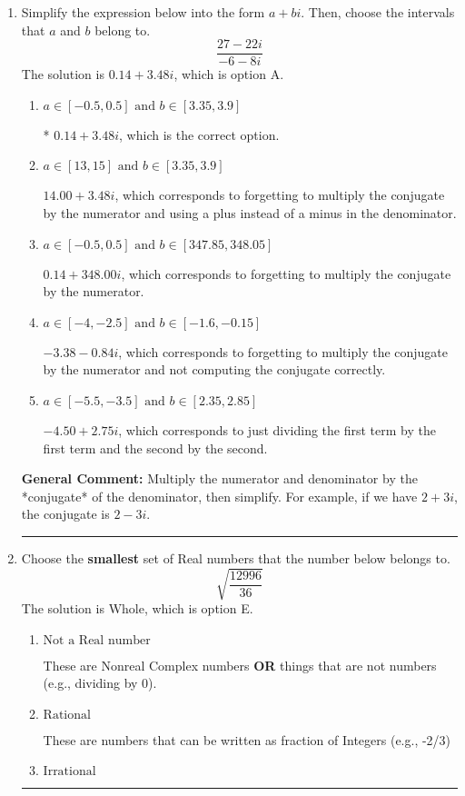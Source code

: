 \documentclass{extbook}[14pt]
\newcommand{\litem}[1]{\item #1

\rule{\textwidth}{0.4pt}}
\begin{document}
\begin{enumerate}\litem{
Simplify the expression below into the form $a+bi$. Then, choose the intervals that $a$ and $b$ belong to.
\[ \frac{27 - 22 i}{-6 - 8 i} \]The solution is \( 0.14  + 3.48 i \), which is option A.\begin{enumerate}[label=\Alph*.]
\item \( a \in [-0.5, 0.5] \text{ and } b \in [3.35, 3.9] \)

* $0.14  + 3.48 i$, which is the correct option.
\item \( a \in [13, 15] \text{ and } b \in [3.35, 3.9] \)

 $14.00  + 3.48 i$, which corresponds to forgetting to multiply the conjugate by the numerator and using a plus instead of a minus in the denominator.
\item \( a \in [-0.5, 0.5] \text{ and } b \in [347.85, 348.05] \)

 $0.14  + 348.00 i$, which corresponds to forgetting to multiply the conjugate by the numerator.
\item \( a \in [-4, -2.5] \text{ and } b \in [-1.6, -0.15] \)

 $-3.38  - 0.84 i$, which corresponds to forgetting to multiply the conjugate by the numerator and not computing the conjugate correctly.
\item \( a \in [-5.5, -3.5] \text{ and } b \in [2.35, 2.85] \)

 $-4.50  + 2.75 i$, which corresponds to just dividing the first term by the first term and the second by the second.
\end{enumerate}

\textbf{General Comment:} Multiply the numerator and denominator by the *conjugate* of the denominator, then simplify. For example, if we have $2+3i$, the conjugate is $2-3i$.
}
\litem{
Choose the \textbf{smallest} set of Real numbers that the number below belongs to.
\[ \sqrt{\frac{12996}{36}} \]The solution is \( \text{Whole} \), which is option E.\begin{enumerate}[label=\Alph*.]
\item \( \text{Not a Real number} \)

These are Nonreal Complex numbers \textbf{OR} things that are not numbers (e.g., dividing by 0).
\item \( \text{Rational} \)

These are numbers that can be written as fraction of Integers (e.g., -2/3)
\item \( \text{Irrational} \)


\end{enumerate}}
\end{enumerate}
\end{document}
